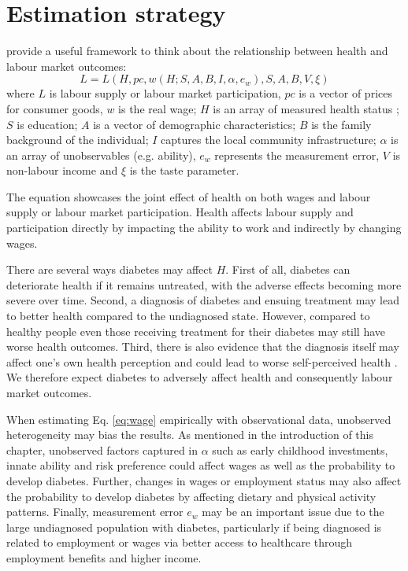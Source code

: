 
\section{\label{sec:Estimation Strategy}Estimation strategy}
 
\textcite{Strauss1998} provide a useful framework to think about the relationship between health and labour market outcomes:
\begin{equation}
L=L(H, pc, w(H;S,A,B,I,\alpha,e_{w}), S, A, B, V, \xi) \label{eq:wage}
\end{equation}
where $L$ is labour supply or labour market participation, $pc $ is a vector of prices for consumer goods, $w$ is the real wage; $H$ is an array of measured health status ; $S$ is education; $A$ is a vector of demographic characteristics; $B$ is the family background of the individual; $I$ captures the local community infrastructure; $\alpha$ is an array of unobservables (e.g. ability), $e_w$ represents the measurement error, $V$ is non-labour income and $\xi$ is the taste parameter. 

The equation showcases the joint effect of health on both wages and labour supply or labour market participation. Health affects labour supply and participation directly by impacting the ability to work and indirectly by changing wages.

There are several ways diabetes may affect $H$. First of all, diabetes can deteriorate health if it remains untreated, with the adverse effects becoming more severe over time. Second, a diagnosis of diabetes and ensuing treatment may lead to better health compared to the undiagnosed state. However, compared to healthy people even those receiving treatment for their diabetes may still have worse health outcomes. Third, there is also evidence that the diagnosis itself may affect one's own health perception and could lead to worse self-perceived health \parencite{Thoolen2006}. We therefore expect diabetes to adversely affect health and consequently labour market outcomes.

When estimating Eq. \ref{eq:wage} empirically with observational data, unobserved heterogeneity may bias the results. As mentioned in the introduction of this chapter, unobserved factors captured in $\alpha$ such as early childhood investments, innate ability and risk preference could affect wages as well as the probability to develop diabetes. Further, changes in wages or employment status may also affect the probability to develop diabetes by affecting dietary and physical activity patterns. Finally, measurement error $e_w$ may be an important issue due to the large undiagnosed population with diabetes, particularly if being diagnosed is related to employment or wages via better access to healthcare through employment benefits and higher income.

